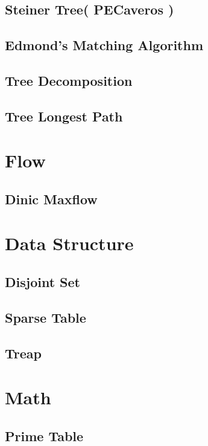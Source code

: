 \documentclass[10pt,twocolumn,oneside]{article}
\begin{document}
\subsection{Steiner Tree( PECaveros )}

\subsection{Edmond's Matching Algorithm}

\subsection{Tree Decomposition}

\subsection{Tree Longest Path}

\section{Flow}
\subsection{Dinic Maxflow}


\section{Data Structure}
\subsection{Disjoint Set}

\subsection{Sparse Table}

\subsection{Treap}


\section{Math}
\subsection{Prime Table}

\end{document}
